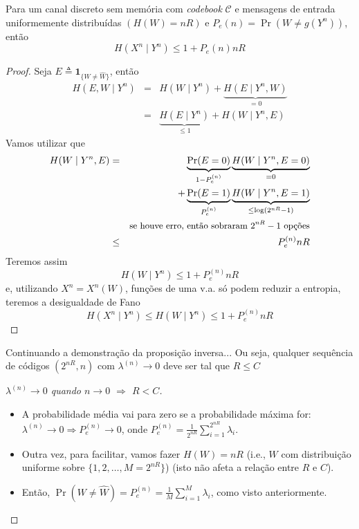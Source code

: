 \begin{frame}[allowframebreaks]
  \begin{theorem}[Fano]
  Para um canal discreto sem memória com \textit{codebook} $\mathcal{C}$ e mensagens de entrada 
  uniformemente distribuídas $(H(W) = nR)$ e $P_e{(n)} = \Pr(W \neq g(Y^n))$, então
	\begin{equation}
	H(X^n \mid Y^n) \leq 1 + P_e{(n)} nR
	\end{equation}
  \end{theorem}
  \framebreak 
  \begin{proof}
  Seja $E \triangleq \mathbf{1}_{\{ W \neq \hat{W} \}}$, então
	\begin{eqnarray}
	H(E, W \mid Y^n) &=& H(W \mid Y^n) + \underbrace{H(E \mid Y^n , W)}_{=0} \nonumber \\
			&=& \underbrace{H(E \mid Y^n)}_{\leq 1} + H(W \mid Y^n , E)
	\end{eqnarray}
  \proofbreak
  Vamos utilizar que 
	\begin{eqnarray}
	H(W \mid Y^n , E) &=& \underbrace{\Pr(E=0)}_{1 - P_e^{(n)}} \underbrace{H(W \mid Y^n, E=0)}_{=0} \nonumber \\
			&& + \underbrace{\Pr(E=1)}_{P_e^{(n)}} \underbrace{H(W \mid Y^n, E=1)}_{\leq\log(2^{nR}-1)} \nonumber \\
			&& \text{\small se houve erro, então sobraram $2^{nR}-1$ opções} \nonumber \\
			&\leq& P_e^{(n)} nR
        \end{eqnarray}
  \proofbreak
  Teremos assim 
	\begin{equation}
	H(W \mid Y^n) \leq 1 + P_e^{(n)} nR
	\end{equation}
  e, utilizando $X^n = X^n(W)$, funções de uma v.a. só podem reduzir a entropia, teremos 
  a desigualdade de Fano
	\begin{equation}
	H(X^n \mid Y^n) \leq H(W \mid Y^n) \leq 1 + P_e^{(n)} nR
        \end{equation}

  \end{proof}
 
  \framebreak

  Continuando a demonstração da proposição inversa...
  Ou seja, qualquer sequência de códigos $(2^{nR},n)$ com $\lambda^{(n)} \rightarrow 0$ deve ser tal que $R \leq C$
  \begin{proof}[$\lambda^{(n)} \rightarrow 0$ quando $n \rightarrow 0$ $\Rightarrow$ $R < C$]
  \begin{itemize}
  \item A probabilidade média vai para zero se a probabilidade máxima for:
	$\lambda^{(n)} \rightarrow 0 \Rightarrow P_{e}^{(n)} \rightarrow 0$, onde $P_{e}^{(n)} = \frac{1}{2^{nR}} \sum_{i=1}^{2^{nR}} \lambda_i$.
  \item Outra vez, para facilitar, vamos fazer $H(W) = nR$ (i.e., $W$ com distribuição uniforme sobre $\{1,2,\ldots, M=2^{nR}\}$)
	(isto não afeta a relação entre $R$ e $C$).
  \item Então, $\Pr(W \neq \hat{W}) = P_e^{(n)} = \frac{1}{M} \sum_{i=1}^M \lambda_i$, como visto anteriormente.
  \end{itemize}


\end{proof}
\end{frame}
